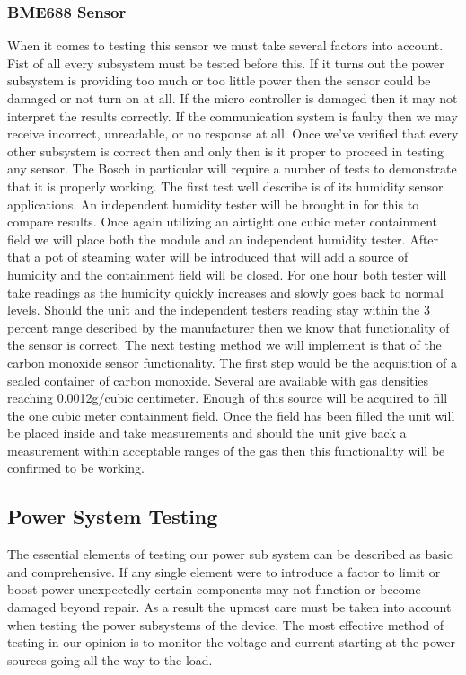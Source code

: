 \subsubsection{BME688 Sensor}
When it comes to testing this sensor we must take several factors into account. Fist of all every subsystem must be tested before this. If it turns out the power subsystem is providing too much or too little power then the sensor could be damaged or not turn on at all. If the micro controller is damaged then it may not interpret the results correctly. If the communication system is faulty then we may receive incorrect, unreadable, or no response at all. Once we've verified that every other subsystem is correct then and only then is it proper to proceed in testing any sensor.
The Bosch in particular will require a number of tests to demonstrate that it is properly working. The first test well describe is of its humidity sensor applications. An independent humidity tester will be brought in for this to compare results. Once again utilizing an airtight one cubic meter containment field we will place both the module and an independent humidity tester. After that a pot of steaming water will be introduced that will add a source of humidity and the containment field will be closed. For one hour both tester will take readings as the humidity quickly increases and slowly goes back to normal levels. Should the unit and the independent testers reading stay within the 3 percent range described by the manufacturer then we know that functionality of the sensor is correct.
The next testing method we will implement is that of the carbon monoxide sensor functionality. The first step would be the acquisition of a sealed container of carbon monoxide. Several are available with gas densities reaching 0.0012g/cubic centimeter. Enough of this source will be acquired to fill the one cubic meter containment field. Once the field has been filled the unit will be placed inside and take measurements and should the unit give back a measurement within acceptable ranges of the gas then this functionality will be confirmed to be working.

\subsection{Power System Testing}
The essential elements of testing our power sub system can be described as basic and comprehensive. If any single element were to introduce a factor to limit or boost power unexpectedly certain components may not function or become damaged beyond repair. As a result the upmost care must be taken into account when testing the power subsystems of the device. The most effective method of testing in our opinion is to monitor the voltage and current starting at the power sources going all the way to the load. 

